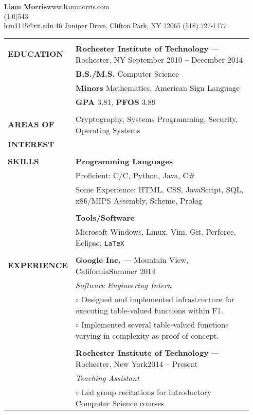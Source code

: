 \documentclass[10pt,letterpaper]{article}
\newcommand{\CPP}{C\nolinebreak[4]\hspace{-.05em}\raisebox{.22ex}{\footnotesize\bf ++}}
\newcommand{\circbullet}{\hspace{10pt}$\circ$ }
\begin{document}
\raggedright

\textbf{\huge{Liam Morris}}\hfill www.liammorris.com\\
\vspace{-8pt}
\line(1,0){543}\\
lcm1115@rit.edu \hfill 46 Juniper Drive, Clifton Park, NY 12065 \hfill (518) 727-1177\\
\vspace{5pt}

\begin{tabular}{@{}lp{6.6in}}
&\\
\textbf{EDUCATION}
&\textbf{Rochester Institute of Technology} --- Rochester, NY \hfill September 2010 -- December 2014\\
&\textbf{B.S./M.S.} Computer Science\\
&\textbf{Minors} Mathematics, American Sign Language\\
&\textbf{GPA} 3.81, \textbf{PFOS} 3.89\\
&\\
\textbf{AREAS OF}
&Cryptography, Systems Programming, Security, Operating Systems\\
\textbf{INTEREST}&\\
&\\
\textbf{SKILLS}
&\textbf{Programming Languages}\\
&Proficient: C/\CPP, Python, Java, C\#\\
&Some Experience: HTML, CSS, JavaScript, SQL, x86/MIPS Assembly, Scheme, Prolog\\
&\\
&\textbf{Tools/Software}\\
&Microsoft Windows, Linux, Vim, Git, Perforce, Eclipse, \texttt{\LaTeX}\\
&\\
\textbf{EXPERIENCE}
&\textbf{Google Inc.} --- Mountain View, California\hfill Summer 2014\\
&\emph{Software Engineering Intern}\\
&\circbullet Designed and implemented infrastructure for executing table-valued functions within F1.\\
&\circbullet Implemented several table-valued functions varying in complexity as proof of concept.\\
&\\
&\textbf{Rochester Institute of Technology} --- Rochester, New York\hfill 2014 -- Present\\
&\emph{Teaching Assistant}\\
&\circbullet Led group recitations for introductory Computer Science courses\\

\end{tabular}
\end{document}
